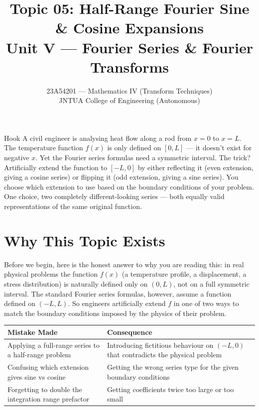 \documentclass[12pt,a4paper]{article}
\title{Topic 05: Half-Range Fourier Sine \& Cosine Expansions \\
       \large Unit V --- Fourier Series \& Fourier Transforms}
\author{23A54201 --- Mathematics IV (Transform Techniques) \\
        JNTUA College of Engineering (Autonomous)}
\date{}
\begin{document}

\maketitle
\tableofcontents
\newpage


\begin{curiositybox}{Hook}
A civil engineer is analysing heat flow along a rod from $x=0$ to $x=L$. The temperature function $f(x)$ is only defined on $[0,L]$ --- it doesn't exist for negative $x$. Yet the Fourier series formulas need a symmetric interval. The trick? Artificially extend the function to $[-L,0]$ by either reflecting it (even extension, giving a cosine series) or flipping it (odd extension, giving a sine series). You choose which extension to use based on the boundary conditions of your problem. One choice, two completely different-looking series --- both equally valid representations of the same original function.
\end{curiositybox}

\section{Why This Topic Exists}

Before we begin, here is the honest answer to why you are reading this: in real physical problems the function $f(x)$ (a temperature profile, a displacement, a stress distribution) is naturally defined only on $(0,L)$, not on a full symmetric interval. The standard Fourier series formulas, however, assume a function defined on $(-L,L)$. So engineers artificially extend $f$ in one of two ways to match the boundary conditions imposed by the physics of their problem.

\medskip
\begin{center}
\begin{tabular}{p{6.5cm} p{7cm}}
\toprule
\textbf{Mistake Made} & \textbf{Consequence} \\
\midrule
Applying a full-range series to a half-range problem & Introducing fictitious behaviour on $(-L,0)$ that contradicts the physical problem \\
\midrule
Confusing which extension gives sine vs cosine & Getting the wrong series type for the given boundary conditions \\
\midrule
Forgetting to double the integration range prefactor & Getting coefficients twice too large or too small \\
\bottomrule
\end{tabular}
\end{center}
\end{document}
